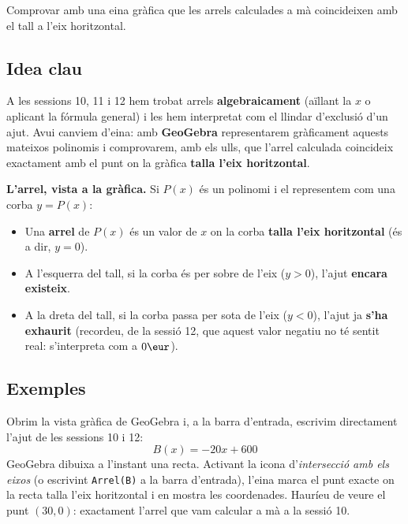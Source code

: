 %
{Comprovar amb una eina gràfica que les arrels calculades a mà coincideixen amb el tall a l'eix horitzontal.}

\subsection{Idea clau}

A les sessions 10, 11 i 12 hem trobat arrels \textbf{algebraicament} (aïllant
la $x$ o aplicant la fórmula general) i les hem interpretat com el llindar
d'exclusió d'un ajut. Avui canviem d'eina: amb \textbf{GeoGebra}
representarem gràficament aquests mateixos polinomis i comprovarem, amb els
ulls, que l'arrel calculada coincideix exactament amb el punt on la gràfica
\textbf{talla l'eix horitzontal}.

\begin{idea}
\textbf{L'arrel, vista a la gràfica.}
Si $P(x)$ és un polinomi i el representem com una corba $y=P(x)$:
\begin{itemize}[leftmargin=1.4em, itemsep=2pt]
  \item Una \textbf{arrel} de $P(x)$ és un valor de $x$ on la corba
        \textbf{talla l'eix horitzontal} (és a dir, $y=0$).
  \item A l'esquerra del tall, si la corba és per sobre de l'eix
        ($y>0$), l'ajut \textbf{encara existeix}.
  \item A la dreta del tall, si la corba passa per sota de l'eix
        ($y<0$), l'ajut ja \textbf{s'ha exhaurit} (recordeu, de la sessió
        12, que aquest valor negatiu no té sentit real: s'interpreta com
        a $0\eur$).
\end{itemize}
\end{idea}

\subsection{Exemples}

\begin{exemple}
Obrim la vista gràfica de GeoGebra i, a la barra d'entrada, escrivim
directament l'ajut de les sessions 10 i 12:
\[
B(x) = -20x + 600
\]
GeoGebra dibuixa a l'instant una recta. Activant la icona d'\emph{intersecció
amb els eixos} (o escrivint \texttt{Arrel(B)} a la barra d'entrada),
l'eina marca el punt exacte on la recta talla l'eix horitzontal i en
mostra les coordenades. Hauríeu de veure el punt $(30, 0)$: exactament
l'arrel que vam calcular a mà a la sessió 10.
\end{exemple}

